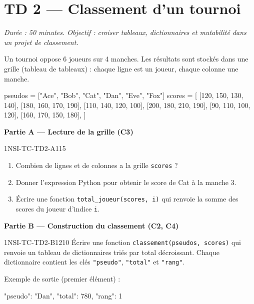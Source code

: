 \section*{TD 2 --- Classement d'un tournoi}
\textit{Durée : 50 minutes. Objectif : croiser tableaux, dictionnaires et mutabilité
dans un projet de classement.}

\bigskip

Un tournoi oppose 6 joueurs sur 4 manches. Les résultats sont stockés dans une
grille (tableau de tableaux) : chaque ligne est un joueur, chaque colonne une manche.

\begin{python}
pseudos = ["Ace", "Bob", "Cat", "Dan", "Eve", "Fox"]
scores = [
    [120, 150, 130, 140],
    [180, 160, 170, 190],
    [110, 140, 120, 100],
    [200, 180, 210, 190],
    [90,  110, 100, 120],
    [160, 170, 150, 180],
]
\end{python}

\textbf{Partie A --- Lecture de la grille (C3)}

\begin{exercice}{1NSI-TC-TD2-A1}{1}{5}
\begin{enumerate}
  \item Combien de lignes et de colonnes a la grille \lstinline{scores} ?
  \item Donner l'expression Python pour obtenir le score de Cat à la manche 3.
  \item Écrire une fonction \lstinline{total_joueur(scores, i)} qui renvoie
        la somme des scores du joueur d'indice \lstinline{i}.
\end{enumerate}
\end{exercice}


\textbf{Partie B --- Construction du classement (C2, C4)}

\begin{exercice}{1NSI-TC-TD2-B1}{2}{10}
Écrire une fonction \lstinline{classement(pseudos, scores)} qui renvoie un
tableau de dictionnaires triés par total décroissant. Chaque dictionnaire
contient les clés \lstinline{"pseudo"}, \lstinline{"total"} et
\lstinline{"rang"}.

Exemple de sortie (premier élément) :
\begin{python}
{"pseudo": "Dan", "total": 780, "rang": 1}
\end{python}
\end{exercice}

